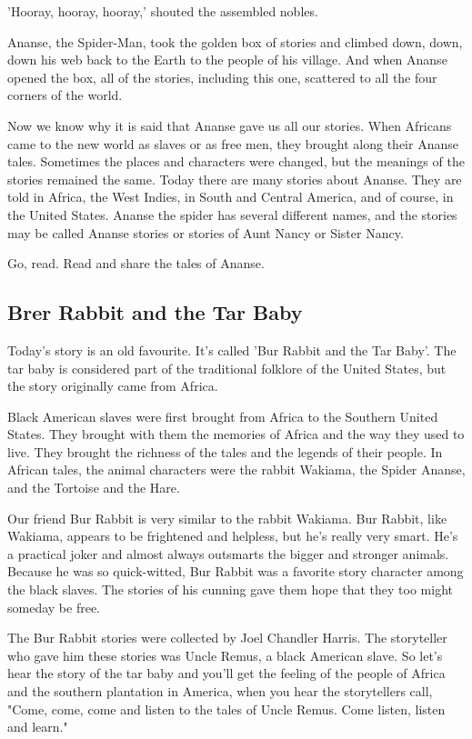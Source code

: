 'Hooray, hooray, hooray,' shouted the assembled nobles.

Ananse, the Spider-Man, took the golden box of stories and climbed down, down, down his web back to the Earth to the people of his village. And when Ananse opened the box, all of the stories, including this one, scattered to all the four corners of the world.

Now we know why it is said that Ananse gave us all our stories. When Africans came to the new world as slaves or as free men, they brought along their Ananse tales. Sometimes the places and characters were changed, but the meanings of the stories remained the same. Today there are many stories about Ananse. They are told in Africa, the West Indies, in South and Central America, and of course, in the United States. Ananse the spider has several different names, and the stories may be called Ananse stories or stories of Aunt Nancy or Sister Nancy.

Go, read. Read and share the tales of Ananse.

\subsection{Brer Rabbit and the Tar Baby}

Today's story is an old favourite. It's called 'Bur Rabbit and the Tar Baby'. The tar baby is considered part of the traditional folklore of the United States, but the story originally came from Africa.

Black American slaves were first brought from Africa to the Southern United States. They brought with them the memories of Africa and the way they used to live. They brought the richness of the tales and the legends of their people. In African tales, the animal characters were the rabbit Wakiama, the Spider Ananse, and the Tortoise and the Hare.

Our friend Bur Rabbit is very similar to the rabbit Wakiama. Bur Rabbit, like Wakiama, appears to be frightened and helpless, but he's really very smart. He's a practical joker and almost always outsmarts the bigger and stronger animals. Because he was so quick-witted, Bur Rabbit was a favorite story character among the black slaves. The stories of his cunning gave them hope that they too might someday be free.

The Bur Rabbit stories were collected by Joel Chandler Harris. The storyteller who gave him these stories was Uncle Remus, a black American slave. So let's hear the story of the tar baby and you'll get the feeling of the people of Africa and the southern plantation in America, when you hear the storytellers call, "Come, come, come and listen to the tales of Uncle Remus. Come listen, listen and learn."

